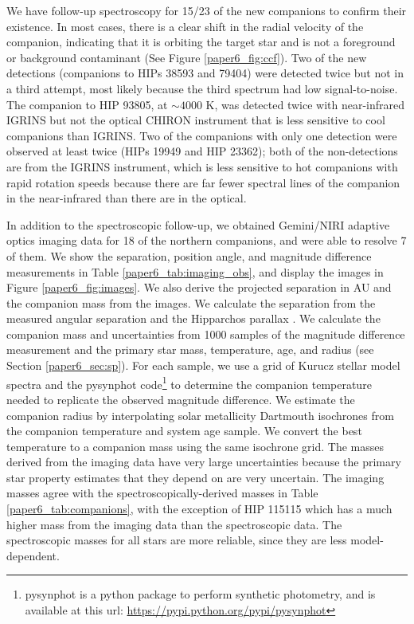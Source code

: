 We have follow-up spectroscopy for 15/23 of the new companions to confirm their existence. In most cases, there is a clear shift in the radial velocity of the companion, indicating that it is orbiting the target star and is not a foreground or background contaminant (See Figure \ref{paper6_fig:ccf}). Two of the new detections (companions to HIPs 38593 and 79404) were detected twice but not in a third attempt, most likely because the third spectrum had low signal-to-noise. The companion to HIP 93805, at $\sim 4000$ K, was detected twice with near-infrared IGRINS but not the optical CHIRON instrument that is less sensitive to cool companions than IGRINS. Two of the companions with only one detection were observed at least twice (HIPs 19949 and HIP 23362); both of the non-detections are from the IGRINS instrument, which is less sensitive to hot companions with rapid rotation speeds because there are far fewer spectral lines of the companion in the near-infrared than there are in the optical.


In addition to the spectroscopic follow-up, we obtained Gemini/NIRI adaptive optics imaging data for 18 of the northern companions, and were able to resolve 7 of them. We show the separation, position angle, and magnitude difference measurements in Table \ref{paper6_tab:imaging_obs}, and display the images in Figure \ref{paper6_fig:images}. We also derive the projected separation in AU and the companion mass from the images. We calculate the separation from the measured angular separation and the Hipparchos parallax \citep{Hipparchos}. We calculate the companion mass and uncertainties from 1000 samples of the magnitude difference measurement and the primary star mass, temperature, age, and radius (see Section \ref{paper6_sec:sp}). For each sample, we use a grid of Kurucz stellar model spectra \citep{Castelli2003}and the pysynphot code\footnote{pysynphot is a python package to perform synthetic photometry, and is available at this url: \url{https://pypi.python.org/pypi/pysynphot}} to determine the companion temperature needed to replicate the observed magnitude difference. We estimate the companion radius by interpolating solar metallicity Dartmouth isochrones \citep{Dotter2008} from the companion temperature and system age sample. We convert the best temperature to a companion mass using the same isochrone grid. The masses derived from the imaging data have very large uncertainties because the primary star property estimates that they depend on are very uncertain. The imaging masses agree with the spectroscopically-derived masses in Table \ref{paper6_tab:companions}, with the exception of HIP 115115 which has a much higher mass from the imaging data than the spectroscopic data. The spectroscopic masses for all stars are more reliable, since they are less model-dependent.

